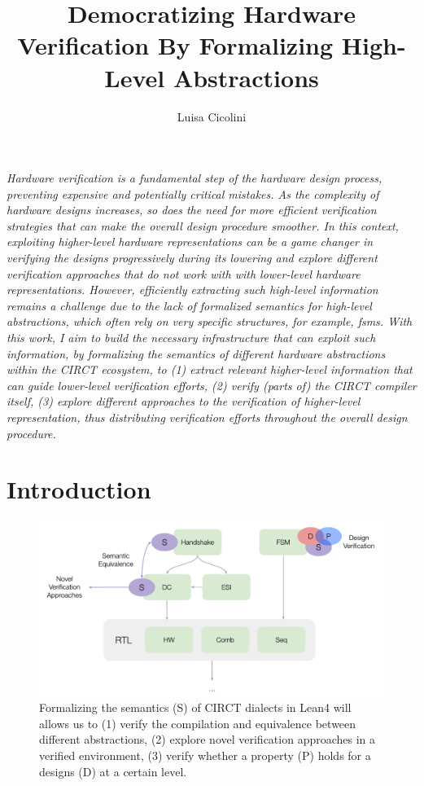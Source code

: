 \documentclass[sigconf,authorversion,nonacm, 11pt]{acmart}
\begin{document}
\title{Democratizing Hardware Verification By Formalizing High-Level Abstractions}

\author{Luisa Cicolini}

\maketitle
\thispagestyle{empty}

\textit{
    Hardware verification is a fundamental step of the hardware design process, preventing expensive and potentially critical 
    mistakes.
    As the complexity of hardware designs increases, so does the need for more efficient verification strategies that can 
    make the overall design procedure smoother.
    In this context, exploiting higher-level hardware representations can be a game changer in verifying the designs 
    progressively during its lowering and explore different verification approaches that do not work with 
    with lower-level hardware representations. 
    However, efficiently extracting such high-level information remains a challenge due to the lack of formalized semantics  
    for high-level abstractions, which often rely on very specific structures, for example, \acp{fsm}.
    With this work, I aim to build the necessary infrastructure that can exploit such information,
    by formalizing the semantics of different hardware abstractions within the CIRCT ecosystem, to 
    (1) extract relevant higher-level information that can guide lower-level verification efforts, 
    (2) verify (parts of) the CIRCT compiler itself, 
    (3) explore different approaches to the verification of higher-level representation, thus distributing verification 
    efforts throughout the overall design procedure. 
}


\section{Introduction}

\begin{figure}[ht]
    \includegraphics[scale=0.8]{semantics.pdf}
    \caption{Formalizing the semantics (S) of CIRCT dialects in Lean4 will allows us to (1) verify the compilation and equivalence 
    between different abstractions, (2) explore novel verification approaches in a verified environment, (3) verify whether a property 
    (P) holds for a designs (D) at a certain level.}
\end{figure}
\end{document}
